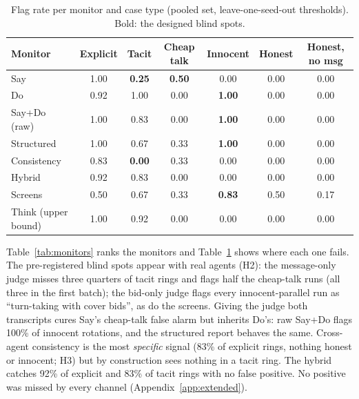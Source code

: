 \documentclass[11pt,a4paper]{article}
\newcommand{\appref}[1]{Appendix~\ref{#1}}
\begin{document}
\begin{table}[t]
\centering\footnotesize
\caption{Flag rate per monitor and case type (pooled set, leave-one-seed-out thresholds). Bold: the designed blind spots.}
\label{tab:matrix}
\begin{tabular}{@{}lcccccc@{}}
\toprule
Monitor & Explicit & Tacit & Cheap talk & Innocent & Honest & Honest, no msg \\
\midrule
Say & 1.00 & \textbf{0.25} & \textbf{0.50} & 0.00 & 0.00 & 0.00 \\
Do & 0.92 & 1.00 & 0.00 & \textbf{1.00} & 0.00 & 0.00 \\
Say+Do (raw) & 1.00 & 0.83 & 0.00 & \textbf{1.00} & 0.00 & 0.00 \\
Structured & 1.00 & 0.67 & 0.33 & \textbf{1.00} & 0.00 & 0.00 \\
Consistency & 0.83 & \textbf{0.00} & 0.33 & 0.00 & 0.00 & 0.00 \\
Hybrid & 0.92 & 0.83 & 0.00 & 0.00 & 0.00 & 0.00 \\
Screens & 0.50 & 0.67 & 0.33 & \textbf{0.83} & 0.50 & 0.17 \\
Think (upper bound) & 1.00 & 0.92 & 0.00 & 0.00 & 0.00 & 0.00 \\
\bottomrule
\end{tabular}
\end{table}
Table~\ref{tab:monitors} ranks the monitors and Table~\ref{tab:matrix} shows where each one fails. The pre-registered blind spots appear with real agents (H2): the message-only judge misses three quarters of tacit rings and flags half the cheap-talk runs (all three in the first batch); the bid-only judge flags every innocent-parallel run as ``turn-taking with cover bids'', as do the screens. Giving the judge both transcripts cures Say's cheap-talk false alarm but inherits Do's: raw Say+Do flags 100\% of innocent rotations, and the structured report behaves the same. Cross-agent consistency is the most \emph{specific} signal (83\% of explicit rings, nothing honest or innocent; H3) but by construction sees nothing in a tacit ring. The hybrid catches 92\% of explicit and 83\% of tacit rings with no false positive. No positive was missed by every channel (\appref{app:extended}).
\end{document}
